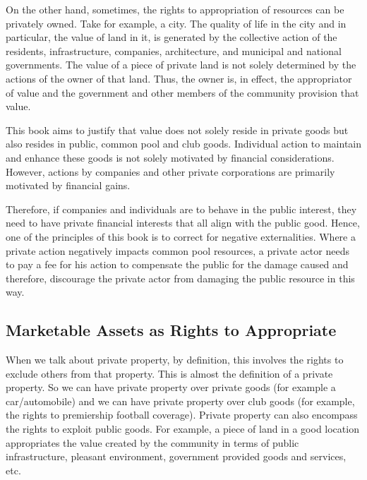 \documentclass[]{tufte-handout}
\begin{document}
On the other hand, sometimes, the rights to appropriation of resources
can be privately owned. Take for example, a city. The quality of life in
the city and in particular, the value of land in it, is generated by the
collective action of the residents, infrastructure, companies,
architecture, and municipal and national governments. The value of a
piece of private land is not solely determined by the actions of the
owner of that land. Thus, the owner is, in effect, the appropriator of
value and the government and other members of the community provision
that value.

This book aims to justify that value does not solely reside in private
goods but also resides in public, common pool and club goods. Individual
action to maintain and enhance these goods is not solely motivated by
financial considerations. However, actions by companies and other
private corporations are primarily motivated by financial gains.

Therefore, if companies and individuals are to behave in the public
interest, they need to have private financial interests that all align
with the public good. Hence, one of the principles of this book is to
correct for negative externalities. Where a private action negatively
impacts common pool resources, a private actor needs to pay a fee for
his action to compensate the public for the damage caused and therefore,
discourage the private actor from damaging the public resource in this
way.

\hypertarget{marketable-assets-as-rights-to-appropriate}{%
\subsection{\texorpdfstring{\textbf{Marketable Assets as Rights to
Appropriate}}{Marketable Assets as Rights to Appropriate}}\label{marketable-assets-as-rights-to-appropriate}}

When we talk about private property, by definition, this involves the
rights to exclude others from that property. This is almost the
definition of a private property. So we can have private property over
private goods (for example a car/automobile) and we can have private
property over club goods (for example, the rights to premiership
football coverage). Private property can also encompass the rights to
exploit public goods. For example, a piece of land in a good location
appropriates the value created by the community in terms of public
infrastructure, pleasant environment, government provided goods and
services, etc.
\end{document}
